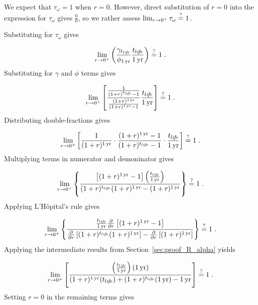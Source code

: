 We expect that $\tau_\omega = 1$ when $r = 0$.
However, direct substitution of $r = 0$ into the expression
for $\tau_\omega$ gives $\frac{0}{0}$, 
so we rather assess
$\lim_{r \to 0^+} \tau_\omega \stackrel{?}{=} 1$.

Substituting for $\tau_\omega$ gives

\begin{equation}
  \lim_{r \to 0^+} \left( \frac{\gamma_{t_{li\!f\!e}}}{\phi_{1\,\mathrm{yr}}} \frac{t_{li\!f\!e}}{1\,\mathrm{yr}} \right) \stackrel{?}{=} 1 \; .
\end{equation}
%
Substituting for $\gamma$ and $\phi$ terms gives

\begin{equation}
  \lim_{r \to 0^+} \left[ \frac{\frac{1}{(1 + r)^{t_{li\!f\!e}} - 1}}{\frac{(1 + r)^{1\,\mathrm{yr}}}{(1 + r)^{1\,\mathrm{yr}} - 1}} \frac{t_{li\!f\!e}}{1\,\mathrm{yr}} \right] \stackrel{?}{=} 1 \; .
\end{equation}
%
Distributing double-fractions gives

\begin{equation}
  \lim_{r \to 0^+} \left[
  \frac{1}{(1 + r)^{1\,\mathrm{yr}}} \cdot
  \frac{(1 + r)^{1\,\mathrm{yr}} - 1}{(1 + r)^{t_{li\!f\!e}} - 1} \cdot
  \frac{t_{li\!f\!e}}{1\,\mathrm{yr}}
  \right] \stackrel{?}{=} 1 \; .
\end{equation}
%
Multiplying terms in numerator and demoninator gives

\begin{equation}
  \lim_{r \to 0^+} 
  \left\{
    \frac{\left[ (1 + r)^{1\,\mathrm{yr}} - 1 \right] \left( \frac{t_{li\!f\!e}}{1\,\mathrm{yr}} \right)}
    {(1 + r)^{t_{li\!f\!e}} (1 + r)^{1\,\mathrm{yr}} - (1 + r)^{1\,\mathrm{yr}}} 
  \right\} \stackrel{?}{=} 1 \; .
\end{equation}
%
Applying L'H\^{o}pital's rule gives

\begin{equation}
  \lim_{r \to 0^+} 
  \left\{
    \frac{\frac{t_{li\!f\!e}}{1\,\mathrm{yr}}
      \frac{\partial}{\partial r} 
        \left[ (1 + r)^{1\,\mathrm{yr}} - 1 \right]}
    {\frac{\partial}{\partial r} \left[ (1 + r)^{t_{li\!f\!e}} (1 + r)^{1\,\mathrm{yr}} \right] - 
     \frac{\partial}{\partial r} \left[ (1 + r)^{1\,\mathrm{yr}} \right]}
  \right\} \stackrel{?}{=} 1 \; .
\end{equation}
%
Applying the intermediate results from Section~\ref{sec:proof_R_alpha} yields

\begin{equation}
  \lim_{r \to 0^+} 
  \left[
    \frac{\left(\frac{t_{li\!f\!e}}{1\,\mathrm{yr}}\right) (1\,\mathrm{yr})}
         {(1 + r)^{1\,\mathrm{yr}} (t_{li\!f\!e}) + 
          (1 + r)^{t_{li\!f\!e}} (1\,\mathrm{yr}) - 
          1\,\mathrm{yr}}
  \right] \stackrel{?}{=} 1 \; .
\end{equation}
%
Setting $r = 0$ in the remaining terms gives

